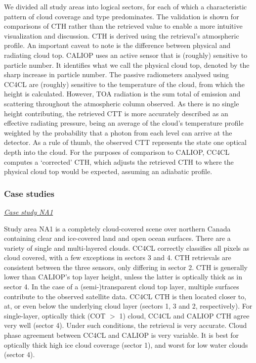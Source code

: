 We divided all study areas into logical sectors, for each of which a characteristic pattern of cloud coverage and type predominates. The validation is shown for comparisons of CTH rather than the retrieved value to enable a more intuitive visualization and discussion. CTH is derived using the retrieval's atmospheric profile. An important caveat to note is the difference between physical and radiating cloud top. CALIOP uses an active sensor that is (roughly) sensitive to particle number. It identifies what we call the physical cloud top, denoted by the sharp increase in particle number. The passive radiometers analysed using CC4CL are (roughly) sensitive to the temperature of the cloud, from which the height is calculated. However, TOA radiation is the sum total of emission and scattering throughout the atmospheric column observed. As there is no single height contributing, the retrieved CTT is more accurately described as an effective radiating pressure, being an average of the cloud’s temperature profile weighted by the probability that a photon from each level can arrive at the detector. As a rule of thumb, the observed CTT represents the state one optical depth into the cloud. For the purposes of comparison to CALIOP, CC4CL computes a `corrected’ CTH, which adjusts the retrieved CTH to where the physical cloud top would be expected, assuming an adiabatic profile.

\subsubsection{Case studies}

\vspace{5mm}\underline{\textit{Case study NA1}}\vspace{2mm}

Study area NA1 is a completely cloud-covered scene over northern Canada containing clear and ice-covered land and open ocean surfaces. There are a variety of single and multi-layered clouds. CC4CL correctly classifies all pixels as cloud covered, with a few exceptions in sectors 3 and 4. CTH retrievals are consistent between the three sensors, only differing in sector 2. CTH is generally lower than CALIOP's top layer height, unless the latter is optically thick as in sector 4. In the case of a (semi-)transparent cloud top layer, multiple surfaces contribute to the observed satellite data. CC4CL CTH is then located closer to, at, or even below the underlying cloud layer (sectors 1, 3 and 2, respectively). For single-layer, optically thick (COT $>$ 1) cloud, CC4CL and CALIOP CTH agree very well (sector 4). Under such conditions, the retrieval is very accurate. Cloud phase agreement between CC4CL and CALIOP is very variable. It is best for optically thick high ice cloud coverage (sector 1), and worst for low water clouds (sector 4).

